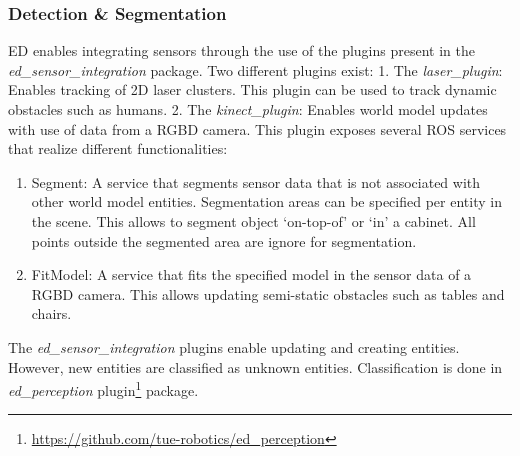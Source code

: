 \subsubsection{Detection \& Segmentation}
ED enables integrating sensors through the use of the plugins present in the \textit{ed\_sensor\_integration} package.
Two different plugins exist:
1. The \emph{laser\_plugin}: Enables tracking of 2D laser clusters. This plugin can be used to track dynamic obstacles such as humans.
2. The \emph{kinect\_plugin}: Enables world model updates with use of data from a RGBD camera. This plugin exposes several ROS services that realize different functionalities:
\begin{enumerate}[label=(\alph*)]
\item Segment: A service that segments sensor data that is not associated with other world model entities. Segmentation areas can be specified per entity in the scene. This allows to segment object `on-top-of’ or ‘in’ a cabinet. All points outside the segmented area are ignore for segmentation.
\item FitModel: A service that fits the specified model in the sensor data of a RGBD camera. This allows updating semi-static obstacles such as tables and chairs.
\end{enumerate}

The \emph{ed\_sensor\_integration} plugins enable updating and creating entities. However, new entities are classified as unknown entities. Classification is done in \emph{ed\_perception} plugin\footnote{\url{https://github.com/tue-robotics/ed_perception}} package. 